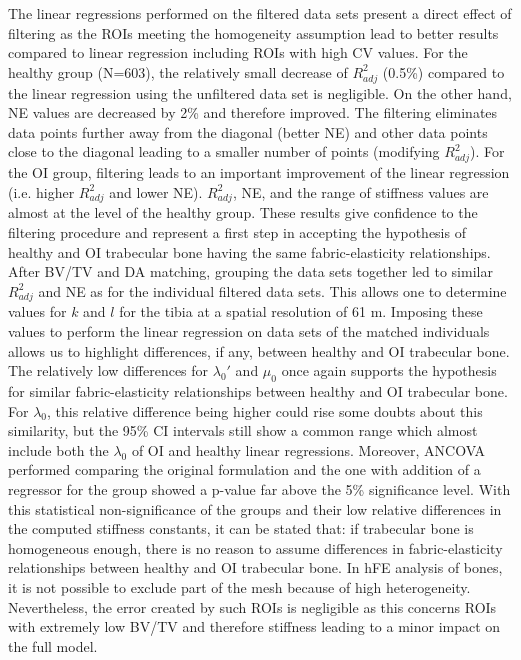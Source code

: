\documentclass[a4paper,fleqn]{DC_ArtStyle}
\begin{document}
The linear regressions performed on the filtered data sets present a direct effect of filtering as the ROIs meeting the homogeneity assumption lead to better results compared to linear regression including ROIs with high CV values. For the healthy group (N=603), the relatively small decrease of $R^2_{adj}$ (0.5\%) compared to the linear regression using the unfiltered data set is negligible. On the other hand, NE values are decreased by 2\% and therefore improved. The filtering eliminates data points further away from the diagonal (better NE) and other data points close to the diagonal leading to a smaller number of points (modifying $R^2_{adj}$). For the OI group, filtering leads to an important improvement of the linear regression (i.e. higher $R^2_{adj}$ and lower NE). $R^2_{adj}$, NE, and the range of stiffness values are almost at the level of the healthy group. These results give confidence to the filtering procedure and represent a first step in accepting the hypothesis of healthy and OI trabecular bone having the same fabric-elasticity relationships.\\
After BV/TV and DA matching, grouping the data sets together led to similar $R^2_{adj}$ and NE as for the individual filtered data sets. This allows one to determine values for $k$ and $l$ for the tibia at a spatial resolution of 61 \si{\micro}m. Imposing these values to perform the linear regression on data sets of the matched individuals allows us to highlight differences, if any, between healthy and OI trabecular bone. The relatively low differences for $\lambda_0'$ and $\mu_0$ once again supports the hypothesis for similar fabric-elasticity relationships between healthy and OI trabecular bone. For $\lambda_0$, this relative difference being higher could rise some doubts about this similarity, but the 95\% CI intervals still show a common range which almost include both the $\lambda_0$ of OI and healthy linear regressions. Moreover, ANCOVA performed comparing the original formulation and the one with addition of a regressor for the group showed a p-value far above the 5\% significance level. With this statistical non-significance of the groups and their low relative differences in the computed stiffness constants, it can be stated that: if trabecular bone is homogeneous enough, there is no reason to assume differences in fabric-elasticity relationships between healthy and OI trabecular bone. In hFE analysis of bones, it is not possible to exclude part of the mesh because of high heterogeneity. Nevertheless, the error created by such ROIs is negligible as this concerns ROIs with extremely low BV/TV and therefore stiffness leading to a minor impact on the full model.\\
\end{document}
